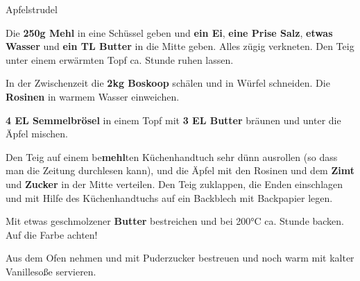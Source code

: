 \begin{recipe}[]{Apfelstrudel} %

\step
Die \textbf{250g Mehl} in eine Schüssel geben und \textbf{ein Ei}, \textbf{eine Prise Salz}, \textbf{etwas Wasser} und \textbf{ein TL Butter} in die Mitte geben. Alles zügig verkneten. Den Teig unter einem erwärmten Topf ca.  Stunde ruhen lassen.

\step
In der Zwischenzeit die \textbf{2kg Boskoop} schälen und in Würfel schneiden.
Die \textbf{Rosinen} in warmem Wasser einweichen.

\step
\textbf{4 EL Semmelbrösel} in einem Topf mit \textbf{3 EL Butter} bräunen und unter die Äpfel mischen.

\step
Den Teig auf einem be\textbf{mehl}ten Küchenhandtuch sehr dünn ausrollen (so dass man die Zeitung durchlesen kann), und die Äpfel mit den Rosinen und dem \textbf{Zimt} und \textbf{Zucker} in der Mitte verteilen. Den Teig zuklappen, die Enden einschlagen und mit Hilfe des Küchenhandtuchs auf ein Backblech mit Backpapier legen.

\step
Mit etwas geschmolzener \textbf{Butter} bestreichen und bei 200°C ca.  Stunde backen. Auf die Farbe achten!

\step
Aus dem Ofen nehmen und mit Puderzucker bestreuen und noch warm mit kalter Vanillesoße servieren.


\end{recipe}
